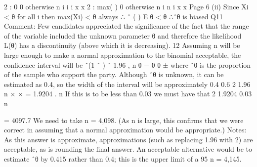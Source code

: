 \documentclass[a4paper,12pt]{article}
\begin{document}
2
: 0
0 otherwise
n
i
i i
x
x
2
: max( )
0 otherwise
n
i
n i
x
x
Page 6
(ii) Since Xi < θ for all i
then max(Xi) < θ always
∴ ˆ ( ) E θ < θ ∴ˆθ is biased
Q11 Comment: Few candidates appreciated the significance of the fact that the range of the
variable included the unknown parameter θ and therefore the likelihood L(θ) has a
discontinuity (above which it is decreasing).
12 Assuming n will be large enough to make a normal approximation to the
binomial acceptable, the confidence interval will be
ˆ(1 ˆ ) ˆ 1.96 ,
n
θ − θ θ ± where ˆθ is the proportion of the sample who support the party.
Although ˆθ is unknown, it can be estimated as 0.4, so the width of the interval
will be approximately
0.4 0.6
2 1.96
n
× × =
1.9204
.
n
If this is to be less than 0.03 we must have that
2 1.9204
0.03
n

= 4097.7
We need to take n = 4,098.
(As n is large, this confirms that we were correct in assuming that a normal
approximation would be appropriate.)
Notes: As this answer is approximate, approximations (such as replacing 1.96
with 2) are acceptable, as is rounding the final answer.
An acceptable alternative would be to estimate ˆθ by 0.415 rather than 0.4; this
is the upper limit of a 95%
n = 4,145.
\end{document}

